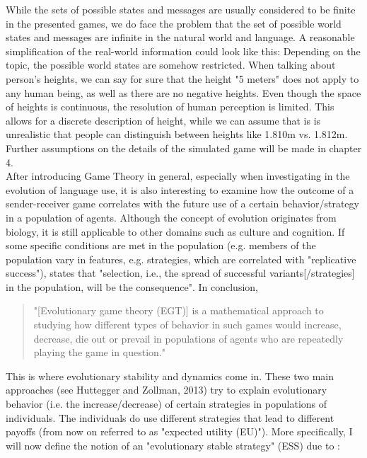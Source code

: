 While the sets of possible states and messages are usually considered to be
finite in the presented games, we do face the problem that the set of possible
world states and messages are infinite in the natural world and language. A reasonable simplification of the real-world information could look like this:
Depending on the topic, the possible world states are somehow restricted. When
talking about person's heights, we can say for sure that the height "5 meters"
does not apply to any human being, as well as there are no negative heights. 
Even though the space of heights is continuous, the resolution of human perception is limited. This allows for a discrete description of height, while we can assume that is is unrealistic that people can distinguish between heights like 1.810m vs. 1.812m.
Further assumptions on the details of the simulated game will be made in chapter 4.\\

After introducing Game Theory in general, especially when investigating in the evolution of language use, it is also interesting to examine how the outcome of a sender-receiver game correlates with the future use of a certain behavior/strategy in a population of agents. Although the concept of evolution originates from biology, it is still applicable to other domains such as culture and cognition. If some specific conditions are met in the population (e.g. members of the population vary in features, e.g. strategies, which are correlated with "replicative success"), \cite{jager2007evolution} states that "selection, i.e., the spread of successful variants[/strategies] in the population, will be the consequence". In conclusion, 
\begin{quote} 
"[Evolutionary game theory (EGT)] is a mathematical approach to studying how different types of behavior in such games would increase, decrease, die out or prevail in populations of agents who are repeatedly playing the game in question." \citep{franke2014game}
\end{quote}
This is where evolutionary stability and dynamics come in. These two main approaches (see Huttegger and Zollman, 2013) try to explain evolutionary behavior (i.e. the increase/decrease) of certain strategies in populations of individuals. The individuals do use different strategies that lead to different payoffs (from now on referred to as "expected utility (EU)"). More specifically, I will now define the notion of an "evolutionary stable strategy" (ESS) due to \cite{thomas1985evolutionarily}:\\

